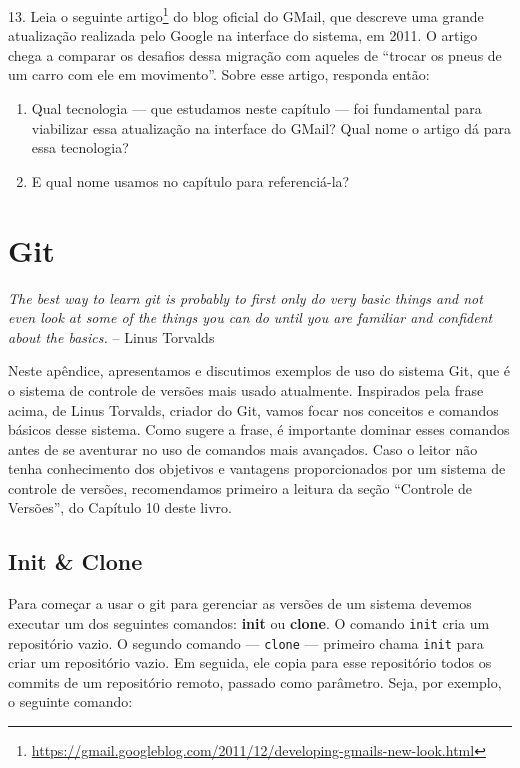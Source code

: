 \documentclass[
  11pt,
  twoside]{book}
\newcommand{\passthrough}[1]{#1}
\DeclareRobustCommand{\href}[2]{#2\footnote{\url{#1}}}
\renewenvironment{quote}{\centering \vspace{1.5ex} \begin{tcolorbox}[colback=backcolor, width=4.9in]}{\end{tcolorbox}}
\begin{document}
13. Leia o seguinte
\href{https://gmail.googleblog.com/2011/12/developing-gmails-new-look.html}{artigo}
do blog oficial do GMail, que descreve uma grande atualização realizada
pelo Google na interface do sistema, em 2011. O artigo chega a comparar
os desafios dessa migração com aqueles de ``trocar os pneus de um carro
com ele em movimento''. Sobre esse artigo, responda então:

\begin{enumerate}
\def\labelenumi{\alph{enumi}.}
\item
  Qual tecnologia --- que estudamos neste capítulo --- foi fundamental
  para viabilizar essa atualização na interface do GMail? Qual nome o
  artigo dá para essa tecnologia?
\item
  E qual nome usamos no capítulo para referenciá-la?
\end{enumerate}

\appendix

\hypertarget{git}{%
\chapter{Git}\label{git}}

\begin{quote}
\emph{The best way to learn git is probably to first only do very basic
things and not even look at some of the things you can do until you are
familiar and confident about the basics.} -- Linus Torvalds
\end{quote}

  Neste apêndice, apresentamos e
discutimos exemplos de uso do sistema Git, que é o sistema de controle
de versões mais usado atualmente. Inspirados pela frase acima, de Linus
Torvalds, criador do Git, vamos focar nos conceitos e comandos básicos
desse sistema. Como sugere a frase, é importante dominar esses comandos
antes de se aventurar no uso de comandos mais avançados. Caso o leitor
não tenha conhecimento dos objetivos e vantagens proporcionados por um
sistema de controle de versões, recomendamos primeiro a leitura da seção
``Controle de Versões'', do Capítulo 10 deste livro.

\hypertarget{init-clone}{%
\section{Init \& Clone}\label{init-clone}}

 

Para começar a usar o git para gerenciar as versões de um sistema
devemos executar um dos seguintes comandos: \textbf{init} ou
\textbf{clone}. O comando \passthrough{\lstinline!init!} cria um
repositório vazio. O segundo comando --- \passthrough{\lstinline!clone!}
--- primeiro chama \passthrough{\lstinline!init!} para criar um
repositório vazio. Em seguida, ele copia para esse repositório todos os
commits de um repositório remoto, passado como parâmetro. Seja, por
exemplo, o seguinte comando:
\end{document}
